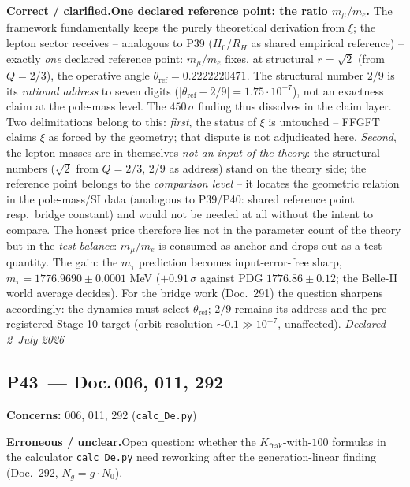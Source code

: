 \smallskip\noindent\textbf{Correct / clarified.}\quad \textbf{One declared reference point: the ratio $m_\mu/m_e$.} The framework fundamentally keeps the purely theoretical derivation from $\xi$; the lepton sector receives -- analogous to P39 ($H_0$/$R_H$ as shared empirical reference) -- exactly \emph{one} declared reference point: $m_\mu/m_e$ fixes, at structural $r=\sqrt2$ (from $Q=2/3$), the operative angle $\theta_{\text{ref}}=0.2222220471$. The structural number $2/9$ is its \emph{rational address} to seven digits ($|\theta_{\text{ref}}-2/9|=1.75\cdot10^{-7}$), not an exactness claim at the pole-mass level. The $450\,\sigma$ finding thus dissolves in the claim layer. Two delimitations belong to this: \emph{first}, the status of $\xi$ is untouched -- FFGFT claims $\xi$ as forced by the geometry; that dispute is not adjudicated here. \emph{Second}, the lepton masses are in themselves \emph{not an input of the theory}: the structural numbers ($\sqrt2$ from $Q=2/3$, $2/9$ as address) stand on the theory side; the reference point belongs to the \emph{comparison level} -- it locates the geometric relation in the pole-mass/SI data (analogous to P39/P40: shared reference point resp.\ bridge constant) and would not be needed at all without the intent to compare. The honest price therefore lies not in the parameter count of the theory but in the \emph{test balance}: $m_\mu/m_e$ is consumed as anchor and drops out as a test quantity. The gain: the $m_\tau$ prediction becomes input-error-free sharp, $m_\tau = 1776.9690 \pm 0.0001$ MeV ($+0.91\,\sigma$ against PDG $1776.86\pm0.12$; the Belle-II world average decides). For the bridge work (Doc.~291) the question sharpens accordingly: the dynamics must select $\theta_{\text{ref}}$; $2/9$ remains its address and the pre-registered Stage-10 target (orbit resolution $\sim0.1 \gg 10^{-7}$, unaffected). \emph{Declared 2~July 2026}


\medskip


\subsection*{P43~--- Doc.\,006, 011, 292}

\noindent\textbf{Concerns:} 006, 011, 292 (\texttt{calc\_De.py})


\smallskip\noindent\textbf{Erroneous / unclear.}\quad Open question: whether the $K_{\text{frak}}$-with-$100$ formulas in the calculator \texttt{calc\_De.py} need reworking after the generation-linear finding (Doc.~292, $N_g=g\cdot N_0$).


